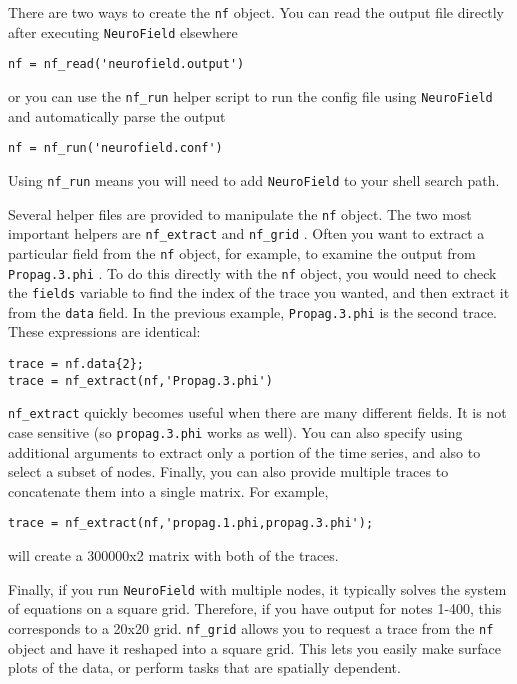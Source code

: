 \documentclass[12pt,a4paper]{article}
\newcommand{\type}[1]{ {\small\small\tt #1} }
\newcommand{\NF}[0]{ \type{NeuroField}}
\begin{document}
There are two ways to create the \type{nf} object. You can read the output file directly after executing \NF elsewhere

\begin{lstlisting}
nf = nf_read('neurofield.output')
\end{lstlisting}

or you can use the \type{nf\_run} helper script to run the config file using \NF and automatically parse the output

\begin{lstlisting}
nf = nf_run('neurofield.conf')
\end{lstlisting}

Using \type{nf\_run} means you will need to add \NF to your shell search path.

Several helper files are provided to manipulate the \type{nf} object. The two most important helpers are \type{nf\_extract} and \type{nf\_grid}. Often you want to extract a particular field from the \type{nf} object, for example, to examine the output from \type{Propag.3.phi}. To do this directly with the \type{nf} object, you would need to check the \type{fields} variable to find the index of the trace you wanted, and then extract it from the \type{data} field. In the previous example, \type{Propag.3.phi} is the second trace. These expressions are identical:
\begin{lstlisting}
trace = nf.data{2};
trace = nf_extract(nf,'Propag.3.phi')
\end{lstlisting}
\type{nf\_extract} quickly becomes useful when there are many different fields. It is not case sensitive (so \type{propag.3.phi} works as well). You can also specify using additional arguments to extract only a portion of the time series, and also to select a subset of nodes. Finally, you can also provide multiple traces to concatenate them into a single matrix. For example,
\begin{lstlisting}
trace = nf_extract(nf,'propag.1.phi,propag.3.phi');
\end{lstlisting}
will create a 300000x2 matrix with both of the traces. 

Finally, if you run \NF with multiple nodes, it typically solves the system of equations on a square grid. Therefore, if you have output for notes 1-400, this corresponds to a 20x20 grid. \type{nf\_grid} allows you to request a trace from the \type{nf} object and have it reshaped into a square grid. This lets you easily make surface plots of the data, or perform tasks that are spatially dependent. 
\end{document}
